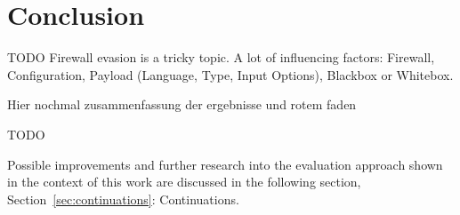 \section{Conclusion}
\label{sec:conclusion}
{\color{red}TODO
Firewall evasion is a tricky topic. A lot of influencing factors: Firewall, Configuration, Payload (Language, Type, Input Options), Blackbox or Whitebox. 

Hier nochmal zusammenfassung der ergebnisse und rotem faden
}



{\color{red} TODO}

Possible improvements and further research into the evaluation approach shown in the context of this work are discussed in the following section, Section~\ref{sec:continuations}: Continuations. 


